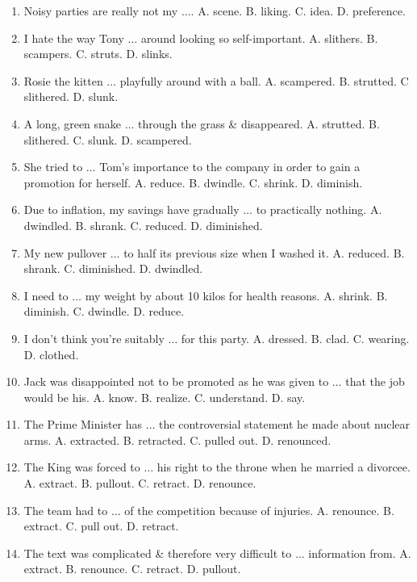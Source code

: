 \documentclass{article}
\numberwithin{equation}{section}
\begin{document}
\begin{enumerate}[leftmargin=2mm]
	\item Noisy parties are really not my $\ldots$. {\sf A.} scene. {\sf B.} liking. {\sf C.} idea. {\sf D.} preference.
	\item I hate the way Tony $\ldots$ around looking so self-important. {\sf A.} slithers. {\sf B.} scampers. {\sf C.} struts. {\sf D.} slinks.
	\item Rosie the kitten $\ldots$ playfully around with a ball. {\sf A.} scampered. {\sf B.} strutted. C slithered. {\sf D.} slunk.
	\item A long, green snake $\ldots$ through the grass \& disappeared. {\sf A.} strutted. {\sf B.} slithered. {\sf C.} slunk. {\sf D.} scampered.
	\item She tried to $\ldots$ Tom's importance to the company in order to gain a promotion for herself. {\sf A.} reduce. {\sf B.} dwindle. {\sf C.} shrink. {\sf D.} diminish.
	\item Due to inflation, my savings have gradually $\ldots$ to practically nothing. {\sf A.} dwindled. {\sf B.} shrank. {\sf C.} reduced. {\sf D.} diminished.
	\item My new pullover $\ldots$ to half its previous size when I washed it. {\sf A.} reduced. {\sf B.} shrank. {\sf C.} diminished. {\sf D.} dwindled.
	\item I need to $\ldots$ my weight by about 10 kilos for health reasons. {\sf A.} shrink. {\sf B.} diminish. {\sf C.} dwindle. {\sf D.} reduce.
	\item I don't think you're suitably $\ldots$ for this party. {\sf A.} dressed. {\sf B.} clad. {\sf C.} wearing. {\sf D.} clothed.
	\item Jack was disappointed not to be promoted as he was given to $\ldots$ that the job would be his. {\sf A.} know. {\sf B.} realize. {\sf C.} understand. {\sf D.} say.
	\item The Prime Minister has $\ldots$ the controversial statement he made about nuclear arms. {\sf A.} extracted. {\sf B.} retracted. {\sf C.} pulled out. {\sf D.} renounced.
	\item The King was forced to $\ldots$ his right to the throne when he married a divorcee. {\sf A.} extract. {\sf B.} pullout. {\sf C.} retract. {\sf D.} renounce.
	\item The team had to $\ldots$ of the competition because of injuries. {\sf A.} renounce. {\sf B.} extract. {\sf C.} pull out. {\sf D.} retract.
	\item The text was complicated \& therefore very difficult to $\ldots$ information from. {\sf A.} extract. {\sf B.} renounce. {\sf C.} retract. {\sf D.} pullout.

\end{enumerate}
\end{document}
